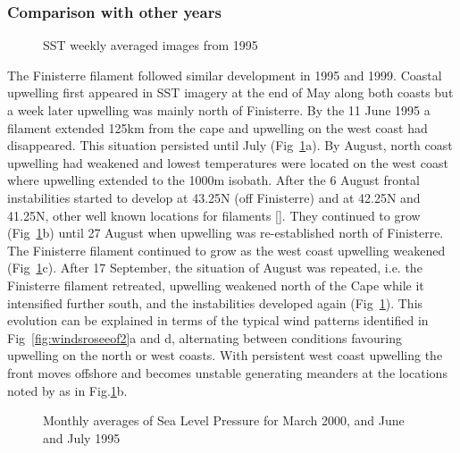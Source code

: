 \subsubsection{Comparison with other years}
\subcapnoonelinetrue \subfiguretopcapfalse
\begin{figure}[t]
\quad
{}\quad
{}\quad
{} \caption{SST weekly
averaged images from 1995}\label{fig:windssst95}
\end{figure}

The Finisterre filament followed similar development in 1995 and
1999. Coastal upwelling first appeared in SST imagery at the end
of May along both coasts but a week later upwelling was mainly
north of Finisterre. By the 11 June 1995 a filament extended 125km
from the cape and upwelling on the west coast had disappeared.
This situation persisted until July ({Fig~\ref{fig:windssst95}}a).
By August, north coast upwelling had weakened and lowest
temperatures were located on the west coast where upwelling
extended to the 1000m isobath. After the 6 August frontal
instabilities started to develop at 43.25\deg N (off Finisterre)
and at 42.25\deg N and 41.25\deg N, other well known locations for
filaments \nocite{Haynes93}[].
They continued to grow (Fig~\ref{fig:windssst95}b) until 27 August
when upwelling was re-established north of Finisterre. The
Finisterre filament continued to grow as the west coast upwelling
weakened (Fig~\ref{fig:windssst95}c). After 17 September, the
situation of August was repeated, i.e. the Finisterre filament
retreated, upwelling weakened north of the Cape  while it
intensified further south, and the instabilities developed again
(Fig~\ref{fig:windssst95}). This evolution can be explained in
terms of the typical wind patterns identified in
Fig~\ref{fig:windsroseeof2}a and d, alternating between conditions
favouring upwelling on the north or west coasts. With persistent
west coast upwelling the front moves offshore and becomes unstable
generating meanders at the locations noted by  as in Fig.\ref{fig:windssst95}b. \noindent
\subfiguretopcaptrue
\begin{figure}[t]
\quad
{}\quad
{}
\caption{Monthly averages of Sea Level Pressure for March 2000,
and June and July 1995}\label{fig:windsslp}
\end{figure}

